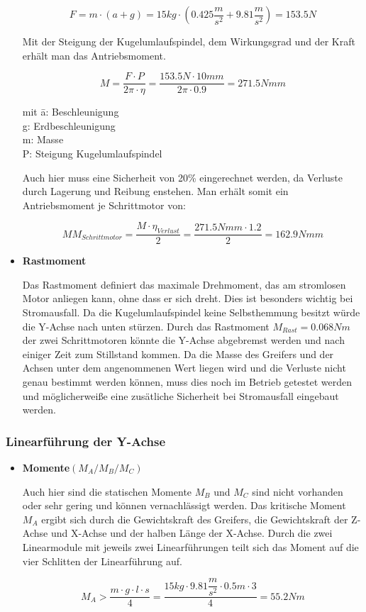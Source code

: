 \documentclass{scrartcl}
\begin{document}
\begin{itemize}
\[F=m\cdot (a+g)=15kg\cdot (0.425\dfrac{m}{s^2}+9.81 \dfrac{m}{s^2})=153.5N\]

Mit der Steigung der Kugelumlaufspindel, dem Wirkungsgrad und der Kraft erhält man das Antriebsmoment.

\[M=\dfrac{F\cdot P}{2\pi\cdot \eta}=\dfrac{153.5N\cdot 10mm}{2\pi\cdot 0.9}=271.5Nmm\]



\begin{tabbing}
mit \=a: Beschleunigung\\
		\>g: Erdbeschleunigung\\
		\>m: Masse\\
		\>P: Steigung Kugelumlaufspindel\\
		
\end{tabbing}

Auch hier muss eine Sicherheit von 20\% eingerechnet werden, da Verluste durch Lagerung und Reibung enstehen.   
Man erhält somit ein Antriebsmoment je Schrittmotor von:

\[M{M_{Schrittmotor}}=\dfrac{M\cdot \eta_{Verlust}}{2}=\dfrac{271.5Nmm\cdot 1.2}{2}=162.9 Nmm\]


\item \textbf{Rastmoment}

Das Rastmoment definiert das maximale Drehmoment, das am stromlosen Motor anliegen kann, ohne dass er sich dreht.
Dies ist besonders wichtig bei Stromausfall. Da die Kugelumlaufspindel keine Selbsthemmung besitzt würde die Y-Achse
nach unten stürzen. Durch das Rastmoment $M_{Rast}=0.068Nm$ der zwei Schrittmotoren könnte die Y-Achse abgebremst werden und nach einiger Zeit zum Stillstand kommen. Da die Masse des Greifers und der Achsen unter dem angenommenen Wert liegen wird und die Verluste nicht genau bestimmt werden können, muss dies noch im Betrieb getestet werden und möglicherweiße eine zusätliche Sicherheit bei Stromausfall eingebaut werden. 


\end{itemize}
\newpage
\subsubsection{Linearführung der Y-Achse}

\begin{itemize}
\item \textbf{Momente$(M_A/M_B/M_C)$}

Auch hier sind die statischen Momente $M_B$ und $M_C$ sind nicht vorhanden oder sehr gering und können vernachlässigt werden. Das kritische Moment $M_A$ ergibt sich durch die Gewichtskraft des Greifers, die Gewichtskraft der Z-Achse und X-Achse und der halben Länge der X-Achse. Durch die zwei Linearmodule mit jeweils zwei Linearführungen teilt sich das Moment auf die vier Schlitten der Linearführung auf.

\[M_A>\dfrac{m\cdot g \cdot l \cdot s}{4}=\dfrac{15kg\cdot 9.81\dfrac{m}{s^2}\cdot 0.5m\cdot 3}{4}=55.2Nm\]


\end{itemize}
\end{document}
